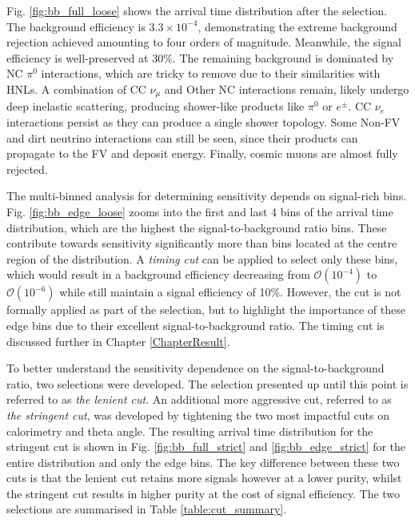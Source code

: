 Fig. \ref{fig:bb_full_loose} shows the arrival time distribution after the selection.
The background efficiency is $3.3 \times 10^{-4}$, demonstrating the extreme background rejection achieved amounting to four orders of magnitude.
Meanwhile, the signal efficiency is well-preserved at $30\%$. 
The remaining background is dominated by NC $\pi^0$ interactions, which are tricky to remove due to their similarities with HNLs.
A combination of CC $\nu_\mu$ and Other NC interactions remain, likely undergo deep inelastic scattering, producing shower-like products like $\pi^0$ or $e^{\pm}$.
CC $\nu_e$ interactions persist as they can produce a single shower topology. 
Some Non-FV and dirt neutrino interactions can still be seen, since their products can propagate to the FV and deposit energy.  
Finally, cosmic muons are almost fully rejected. 

The multi-binned analysis for determining sensitivity depends on signal-rich bins.
Fig. \ref{fig:bb_edge_loose} zooms into the first and last 4 bins of the arrival time distribution, which are the highest the signal-to-background ratio bins.
These contribute towards sensitivity significantly more than bins located at the centre region of the distribution. 
A \textit{timing cut} can be applied to select only these bins, which would result in a background efficiency decreasing from $\mathcal{O}(10^{-4})$ to $\mathcal{O}(10^{-6})$ while still maintain a signal efficiency of 10\%.
However, the cut is not formally applied as part of the selection, but to highlight the importance of these edge bins due to their excellent signal-to-background ratio.
The timing cut is discussed further in Chapter \ref{ChapterResult}.

To better understand the sensitivity dependence on the signal-to-background ratio, two selections were developed.
The selection presented up until this point is referred to as \textit{the lenient cut}.
An additional more aggressive cut, referred to as \textit{the stringent cut}, was developed by tightening the two most impactful cuts on calorimetry and theta angle. 
The resulting arrival time distribution for the stringent cut is shown in Fig. \ref{fig:bb_full_strict} and \ref{fig:bb_edge_strict} for the entire distribution and only the edge bins. 
The key difference between these two cuts is that the lenient cut retains more signals however at a lower purity, whilst the stringent cut results in higher purity at the cost of signal efficiency.
The two selections are summarised in Table \ref{table:cut_summary}.

